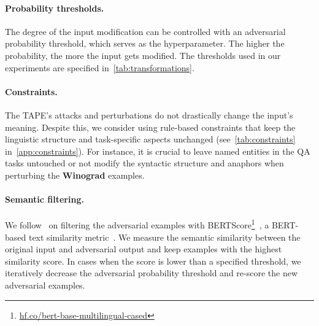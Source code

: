 \documentclass[11pt]{article}
\begin{document}
\paragraph{Probability thresholds.} The degree of the input modification can be controlled with an adversarial probability threshold, which serves as the hyperparameter. The higher the probability, the more the input gets modified. The thresholds used in our experiments are specified in~\autoref{tab:transformations}.

\paragraph{Constraints.} The TAPE's attacks and perturbations do not drastically change the input's meaning. Despite this, we consider using rule-based constraints that keep the linguistic structure and task-specific aspects unchanged (see~\autoref{tab:constraints} in~\autoref{app:constraints}). For instance, it is crucial to leave named entities in the QA tasks untouched or not modify the syntactic structure and anaphors when perturbing the \textbf{Winograd} examples.

\paragraph{Semantic filtering.} We follow~\citeauthor{wang2021adversarial} on filtering the adversarial examples with BERTScore\footnote{\href{https://huggingface.co/bert-base-multilingual-cased}{hf.co/bert-base-multilingual-cased}}~\cite{zhang2019bertscore}, a BERT-based text similarity metric~\cite{devlin-etal-2019-bert}. We measure the semantic similarity between the original input and adversarial output and keep examples with the highest similarity score. In cases when the score is lower than a specified threshold, we iteratively decrease the adversarial probability threshold and re-score the new adversarial examples. 
\end{document}
